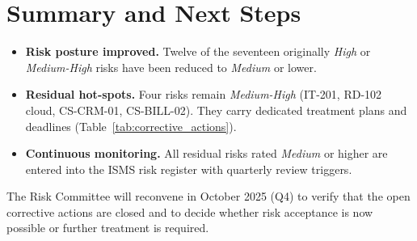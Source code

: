 
\section{Summary and Next Steps}

\begin{itemize}
  \item \textbf{Risk posture improved.}  
        Twelve of the seventeen originally \emph{High} or \emph{Medium-High}
        risks have been reduced to \emph{Medium} or lower.
  \item \textbf{Residual hot-spots.}  
        Four risks remain \emph{Medium-High} (IT-201, RD-102 cloud,
        CS-CRM-01, CS-BILL-02). They carry dedicated treatment plans and
        deadlines (Table~\ref{tab:corrective_actions}).
  \item \textbf{Continuous monitoring.}  
        All residual risks rated \emph{Medium} or higher are entered into the
        ISMS risk register with quarterly review triggers.
\end{itemize}

The Risk Committee will reconvene in October 2025 (Q4) to verify that the open
corrective actions are closed and to decide whether risk acceptance is now
possible or further treatment is required.
